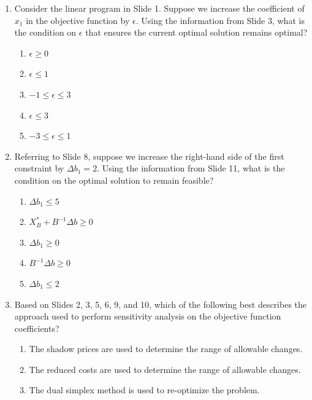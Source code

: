 \documentclass{article}%
\begin{document}
\begin{enumerate}
\begin{enumerate}
\item $\epsilon \le 1$%
\item $-1 \le \epsilon \le 3$%
\item $-3 \le \epsilon \le 1$%
\item There is no restriction on $\epsilon$%
\end{enumerate}%
\vspace{1em}%
\item Consider the linear program in Slide 1. Suppose we increase the coefficient of $x_1$ in the objective function by $\epsilon$. Using the information from Slide 3, what is the condition on $\epsilon$ that ensures the current optimal solution remains optimal?%
\begin{enumerate}%
\item $\epsilon \ge 0$%
\item $\epsilon \le 1$%
\item $-1 \le \epsilon \le 3$%
\item $\epsilon \le 3$%
\item $-3 \le \epsilon \le 1$%
\end{enumerate}%
\vspace{1em}%
\item Referring to Slide 8, suppose we increase the right-hand side of the first constraint by $\Delta b_1 = 2$. Using the information from Slide 11, what is the condition on the optimal solution to remain feasible?%
\begin{enumerate}%
\item $\Delta b_1 \le 5$%
\item $X_B^* + B^{-1}\Delta b \ge 0$%
\item $\Delta b_1 \ge 0$%
\item $B^{-1}\Delta b \ge 0$%
\item $\Delta b_1 \le 2$%
\end{enumerate}%
\vspace{1em}%
\item Based on Slides 2, 3, 5, 6, 9, and 10, which of the following best describes the approach used to perform sensitivity analysis on the objective function coefficients?%
\begin{enumerate}%
\item The shadow prices are used to determine the range of allowable changes.%
\item The reduced costs are used to determine the range of allowable changes.%
\item The dual simplex method is used to re-optimize the problem.%

\end{enumerate}
\end{enumerate}
\end{document}
